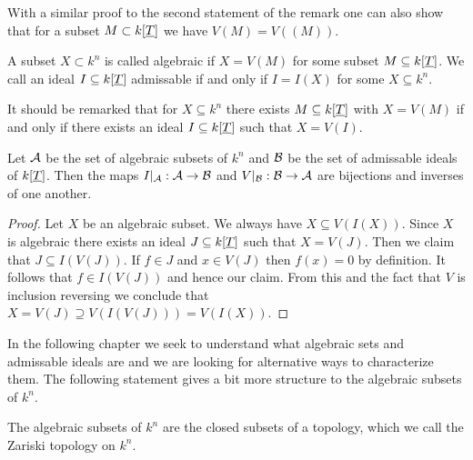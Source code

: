 \documentclass[../notes.tex]{subfiles}
\begin{document}
\noindent
With a similar proof to the second statement of the remark one can also show that
for a subset $M \subset k[{\underline{T}}]$ we have $V(M) = V((M))$.

\smallskip
\begin{defi}{}{}
  A subset $X \subset k^n$ is called algebraic if $X = V(M)$ for some subset
  $M \subseteq k[{\underline{T}}]$. We call an ideal $I \subseteq k[{\underline{T}}]$ admissable
  if and only if $I = I(X)$ for some $X \subseteq k^n$.
\end{defi}

\smallskip
\noindent It should be remarked that for $X \subseteq k^n$ there exists $M \subseteq k[{\underline{T}}]$
with $X = V(M)$ if and only if there exists an ideal $I \subseteq k[{\underline{T}}]$
such that $X = V(I)$.

\smallskip
\begin{lemm}{}{}
  Let ${\mathcal{A}}$ be the set of algebraic subsets of $k^n$ and ${\mathcal{B}}$ be the set of
  admissable ideals of $k[{\underline{T}}]$. Then the
  maps $I|_{\mathcal{A}}: {\mathcal{A}} \to {\mathcal{B}}$ and $V|_{\mathcal{B}}: {\mathcal{B}} \to {\mathcal{A}}$ are bijections and inverses of one another.
\end{lemm}

\begin{proof}
  Let $X$ be an algebraic subset. We always have $X \subseteq V(I(X))$.
  Since $X$ is algebraic there exists an ideal $J \subseteq k[{\underline{T}}]$ such that $X = V(J)$.
  Then we claim that $J \subseteq I(V(J))$. If $f \in J$ and $x \in V(J)$ then
  $f(x) = 0$ by definition. It follows that $f \in I(V(J))$ and hence our claim.
  From this and the fact that $V$ is inclusion reversing we  conclude that
  $X = V(J) \supseteq V(I(V(J))) = V(I(X))$.
  
\end{proof}

\smallskip
\noindent
In the following chapter we seek to understand what algebraic sets and admissable ideals
are and we are looking for alternative ways to characterize them. The following statement
gives a bit more structure to the algebraic subsets of $k^n$.

\smallskip
\begin{lemm}{}{}
  The algebraic subsets of $k^n$ are the closed subsets of a topology, which we
  call the Zariski topology on $k^n$.
\end{lemm}
\end{document}
